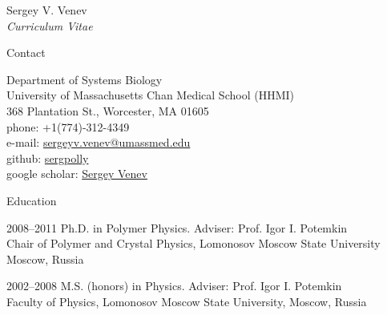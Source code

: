 \documentclass[10pt]{article}
\begin{document}




\newlength{\oldcvlabelwidth}
\renewcommand*{\cvbibname}{}

\begin{cv}{Sergey V. Venev\\{\large \itshape Curriculum Vitae}}

\begin{cvlist}{Contact}
    \item Department of Systems Biology\\
    University of Massachusetts Chan Medical School (HHMI)\\
    368 Plantation St., Worcester, MA 01605\\
    phone: +1(774)-312-4349\\
    e-mail: \href{mailto:sergeyv.venev@umassmed.edu}{sergeyv.venev@umassmed.edu}\\
    github: \href{https://github.com/sergpolly}{sergpolly}\\
    google scholar: \href{https://scholar.google.com/citations?user=stFuORQAAAAJ&hl=en}{Sergey Venev}
\end{cvlist}


\begin{cvlist}{Education}
    \item[2008--2011] Ph.D. in Polymer Physics. Adviser: Prof. Igor I. Potemkin\\
    Chair of Polymer and Crystal Physics, Lomonosov Moscow State University\\
    Moscow, Russia  
    \item[2002--2008] M.S. (honors) in Physics. Adviser: Prof. Igor I. Potemkin\\
    Faculty of Physics, Lomonosov Moscow State University,
    Moscow, Russia  
\end{cvlist}




\end{cv}
\end{document}
